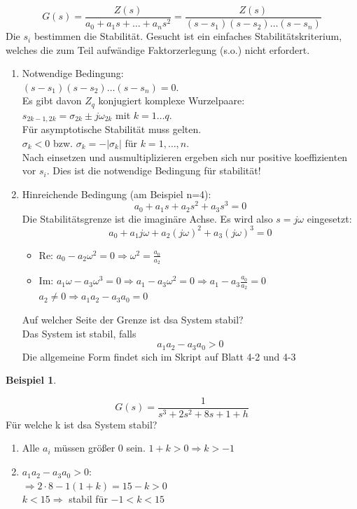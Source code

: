 \documentclass[12pt,a4paper,ngerman]{scrartcl}
\newtheorem{bsp}{Beispiel}[section] %
\begin{document}
\[
G(s)=\frac{Z(s)}{a_0+a_1s+\dots+a_ns^2}=\frac{Z(s)}{(s-s_1)(s-s_2)\dots (s-s_n)}
\]
Die $s_i$ bestimmen die Stabilität. Gesucht ist ein einfaches Stabilitätskriterium, welches die zum Teil aufwändige Faktorzerlegung (s.o.) nicht erfordert.
\begin{enumerate}
\item Notwendige Bedingung:\\
$(s-s_1)(s-s_2)\dots (s-s_n)=0$.\\
Es gibt davon $Z_q$ konjugiert komplexe Wurzelpaare:\\
$s_{2k-1,2k}=\sigma_{2k}\pm j\omega_{2k}$ mit $k=1\dots q$.\\
Für asymptotische Stabilität muss gelten. \\
$\sigma_k<0$ bzw. $\sigma_k=-|\sigma_k|$ für $k=1,\dots, n$. \\
Nach einsetzen und ausmultiplizieren ergeben sich nur positive koeffizienten vor $s_i$. Dies ist die notwendige Bedingung für stabilität!
\item Hinreichende Bedingung (am Beispiel n=4):
\[
a_0+a_1s+a_2s^2+a_3s^3=0
\]
Die Stabilitätsgrenze ist die imaginäre Achse. Es wird also $s=j\omega$ eingesetzt:
\[
a_0+a_1j\omega+a_2(j\omega)^2+a_3(j\omega)^3=0
\]


\begin{itemize}
\item Re: $a_0-a_2\omega^2=0\Rightarrow \omega^2=\frac{a_0}{a_2}$
\item Im: $a_1\omega -a_3\omega^3=0\Rightarrow a_1-a_3\omega^2=0\Rightarrow a_1-a_3\frac{a_0}{a_2}=0$\\
$a_2\neq0 \Rightarrow a_1a_2-a_3a_0=0$ 
\end{itemize}
Auf welcher Seite der Grenze ist dsa System stabil?\\
Das System ist stabil, falls \[a_1a_2-a_3a_0>0\]
Die allgemeine Form findet sich im Skript auf Blatt 4-2 und 4-3
\end{enumerate}
\begin{bsp}
\end{bsp}
\[
G(s)=\frac{1}{s^3+2s^2+8s+1+h}
\]
Für welche k ist dsa System stabil?\\
\begin{enumerate}
\item Alle $a_i$ müssen größer 0 sein. $1+k>0 \Rightarrow k>-1$
\item $a_1a_2-a_3a_0>0$:\\
$\Rightarrow 2\cdot 8-1(1+k)=15-k>0$\\
$k<15 \Rightarrow$ stabil für $-1<k<15$
\end{enumerate}
\end{document}
